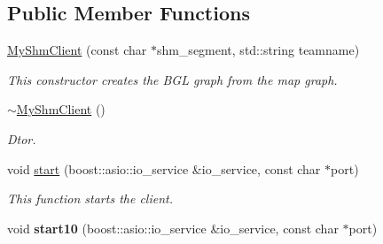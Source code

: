 \subsection*{Public Member Functions}
\begin{DoxyCompactItemize}
\item 
\hyperlink{classjustine_1_1sampleclient_1_1MyShmClient_a7e7a693ff4d4eb7eda923413aa1b26c2}{My\-Shm\-Client} (const char $\ast$shm\-\_\-segment, std\-::string teamname)
\begin{DoxyCompactList}\small\item\em This constructor creates the B\-G\-L graph from the map graph. \end{DoxyCompactList}\item 
\hypertarget{classjustine_1_1sampleclient_1_1MyShmClient_abab9d1fcda42de37996cd169aff36e03}{\hyperlink{classjustine_1_1sampleclient_1_1MyShmClient_abab9d1fcda42de37996cd169aff36e03}{$\sim$\-My\-Shm\-Client} ()}\label{classjustine_1_1sampleclient_1_1MyShmClient_abab9d1fcda42de37996cd169aff36e03}

\begin{DoxyCompactList}\small\item\em Dtor. \end{DoxyCompactList}\item 
void \hyperlink{classjustine_1_1sampleclient_1_1MyShmClient_aa5cb338eade5f427f4a82b28cff4ca14}{start} (boost\-::asio\-::io\-\_\-service \&io\-\_\-service, const char $\ast$port)
\begin{DoxyCompactList}\small\item\em This function starts the client. \end{DoxyCompactList}\item 
\hypertarget{classjustine_1_1sampleclient_1_1MyShmClient_a14dc5382a149b98327d71e8fb6548bd1}{void {\bfseries start10} (boost\-::asio\-::io\-\_\-service \&io\-\_\-service, const char $\ast$port)}\label{classjustine_1_1sampleclient_1_1MyShmClient_a14dc5382a149b98327d71e8fb6548bd1}


\end{DoxyCompactItemize}
